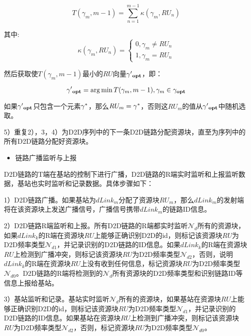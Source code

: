 \documentclass[figurelist,tablelist,algorithmlist,nomlist,masters]{seuthesix}
\begin{document}
	\begin{equation}\label{eq2.9}
	T(\gamma _m,m - 1) = \sum\limits_{n = 1}^{m - 1} {\kappa (\gamma _m,RU_n)}
	\end{equation}
	
	其中:
	\begin{equation}\label{eq2.10}
	\kappa (\gamma _m,RU_n) = \left\{ \begin{array}{l}
	0,\gamma _m \ne RU_n\\
	1,\gamma _m = RU_n
	\end{array} \right.
	\end{equation}
	
	然后获取使$T(\gamma _m,m - 1)$最小的$RU$向量${\bf{\gamma }}{{\bf{'}}_{{\bf{opt}}}}$，即：
	
	\begin{equation}\label{eq2.11}
	{\bf{\gamma }}{{\bf{'}}_{{\bf{opt}}}} = \arg \min T(\gamma _m,m - 1), \gamma _m \in {\bf{\gamma _{opt}}}
	\end{equation}
	
	如果${\bf{\gamma }}{{\bf{'}}_{{\bf{opt}}}}$只包含一个元素${\gamma ^{\rm{*}}}$，那么$RU_m = {\gamma ^{\rm{*}}}$，否则这$RU_m$的值从${\bf{\gamma }}{{\bf{'}}_{{\bf{opt}}}}$中随机选取。
	
	5）重复2），3，4）为D2D序列中的下一条D2D链路分配资源块，直至为序列中的所有D2D链路分配好资源块。
	
	
	\begin{itemize}
		\item 链路广播监听与上报
	\end{itemize}
	
	D2D链路的T端在基站的控制下进行广播，D2D链路的R端实时监听和上报监听数据，基站也实时监听和记录数据。具体步骤如下：
	
	1）D2D链路广播。如果基站为$dLink_m$分配了资源块$RU_m$，那么$dLink_m$的发射端将在该资源块上发送广播信号，广播信号携带$dLink_m$的链路ID信息。
	
	2）D2D链路R端监听和上报。所有D2D链路的R端都实时监听$\mathcal{N}_d$所有的资源块，如果$dLink_k$的R端在资源块$RU$上能够正确识别D2D的id，则标记该资源块$RU$为D2D频率类型$\mathcal{N}_{d1}$，并记录识别的D2D链路的ID信息。如果$dLink_k$的R端在资源块$RU$上检测到广播冲突，则标记该资源块$RU$为D2D频率类型$\mathcal{N}_{d2}$，否则，说明$dLink_k$的R端在资源块$RU$上没有收到任何信息，标记资源块$RU$为D2D频率类型$\mathcal{N}_{d0}$。D2D链路的R端将检测到的$\mathcal{N}_d$所有资源块的D2D频率类型和识别链路ID等信息上报给基站。
	
	3）基站监听和记录。基站实时监听$\mathcal{N}_d$所有的资源块，如果基站在资源块$RU$上能够正确识别D2D的id，则标记该资源块$RU$为D2D频率类型$\mathcal{N}_{d1}$，并记录识别的D2D链路的ID信息。如果基站在资源块$RU$上检测到广播冲突，则标记该资源块$RU$为D2D频率类型$\mathcal{N}_{d2}$，否则，标记资源块$RU$为D2D频率类型$\mathcal{N}_{d0}$。
	
\end{document}
